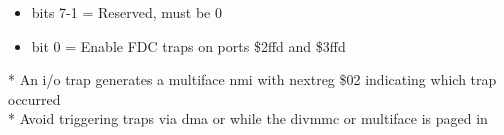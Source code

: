 \begin{itemize}
\item bits 7-1 = Reserved, must be 0
\item bit 0 = Enable FDC traps on ports \$2ffd and \$3ffd
\end{itemize}
* An i/o trap generates a multiface nmi with nextreg \$02 indicating
  which trap occurred\\
* Avoid triggering traps via dma or while the divmmc or multiface is
  paged in

